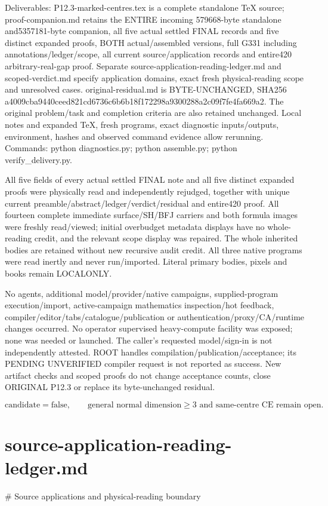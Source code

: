 \documentclass[11pt]{article}
\begin{document}
Deliverables: P12.3-marked-centres.tex is a complete standalone TeX source; proof-companion.md retains the ENTIRE incoming 579668-byte standalone and5357181-byte companion, all five actual settled FINAL records and five distinct expanded proofs, BOTH actual/assembled versions, full G331 including annotations/ledger/scope, all current source/application records and entire420 arbitrary-real-gap proof. Separate source-application-reading-ledger.md and scoped-verdict.md specify application domains, exact fresh physical-reading scope and unresolved cases. original-residual.md is BYTE-UNCHANGED, SHA256 a4009cba9440ceed821cd6736c6b6b18f172298a9300288a2c09f7fe4fa669a2. The original problem/task and completion criteria are also retained unchanged. Local notes and expanded TeX, fresh programs, exact diagnostic inputs/outputs, environment, hashes and observed command evidence allow rerunning. Commands: python diagnostics.py; python assemble.py; python verify\_delivery.py.

All five fields of every actual settled FINAL note and all five distinct expanded proofs were physically read and independently rejudged, together with unique current preamble/abstract/ledger/verdict/residual and entire420 proof. All fourteen complete immediate surface/SH/BFJ carriers and both formula images were freshly read/viewed; initial overbudget metadata displays have no whole-reading credit, and the relevant scope display was repaired. The whole inherited bodies are retained without new recursive audit credit. All three native programs were read inertly and never run/imported. Literal primary bodies, pixels and books remain LOCALONLY.

No agents, additional model/provider/native campaigns, supplied-program execution/import, active-campaign mathematics inspection/hot feedback, compiler/editor/tabs/catalogue/publication or authentication/proxy/CA/runtime changes occurred. No operator supervised heavy-compute facility was exposed; none was needed or launched. The caller's requested model/sign-in is not independently attested. ROOT handles compilation/publication/acceptance; its PENDING UNVERIFIED compiler request is not reported as success. New artifact checks and scoped proofs do not change acceptance counts, close ORIGINAL P12.3 or replace its byte-unchanged residual.

\[
 \text{candidate}=\text{false},\qquad
 \text{general normal dimension}\ge3\text{ and same-centre CE remain open}.
\]


\section*{source-application-reading-ledger.md}
\# Source applications and physical-reading boundary
\end{document}

